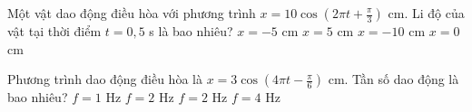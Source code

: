 \begin{ex}
Một vật dao động điều hòa với phương trình $x = 10\cos(2\pi t + \frac{\pi}{3})$ cm. Li độ của vật tại thời điểm $t = 0,5$ s là bao nhiêu?
\choice
{\True $x = -5$ cm}
{$x = 5$ cm}
{$x = -10$ cm}
{$x = 0$ cm}
\end{ex}

\begin{ex}
Phương trình dao động điều hòa là $x = 3\cos(4\pi t - \frac{\pi}{6})$ cm. Tần số dao động là bao nhiêu?
\choice
{$f = 1$ Hz}
{$f = 2$ Hz}
{\True $f = 2$ Hz}
{$f = 4$ Hz}
\end{ex}
